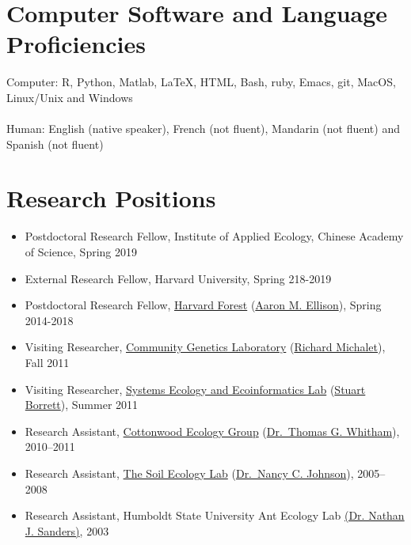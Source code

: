 \documentclass[a4paper]{article}
\begin{document}
\section{Computer Software and Language
Proficiencies}\label{computer-software-and-language-proficiencies}

Computer: R, Python, Matlab, LaTeX, HTML, Bash, ruby, Emacs, git,
MacOS, Linux/Unix and Windows\\\\Human: English (native speaker),
French (not fluent), Mandarin (not fluent) and Spanish (not fluent)

\section{Research Positions}\label{research-experience}

\begin{itemize}
\item Postdoctoral Research Fellow, Institute of Applied Ecology,
  Chinese Academy of Science, Spring 2019
\item External Research Fellow, Harvard University, Spring 218-2019
\item
  Postdoctoral Research Fellow, 
  \href{http://harvardforest.fas.harvard.edu/}{Harvard Forest}
  (\href{http://harvardforest.fas.harvard.edu/aaron-ellison}{Aaron M. Ellison}), Spring 2014-2018
\item
  Visiting Researcher,
  \href{https://www4.bordeaux-aquitaine.inra.fr/biogeco/}{Community
  Genetics Laboratory}
  (\href{http://www4.bordeaux-aquitaine.inra.fr/biogeco_eng/People/Former-members/Michalet-Richard}{Richard Michalet}), Fall 2011
\item
  Visiting Researcher, \href{http://people.uncw.edu/borretts/}{Systems
  Ecology and Ecoinformatics Lab}
  (\href{http://people.uncw.edu/borretts/people.html}{Stuart
  Borrett}), Summer 2011
\item
  Research Assistant, \href{http://www.poplar.nau.edu/}{Cottonwood
  Ecology Group}
  (\href{http://www.poplar.nau.edu/people.php?mode=showus\&user=tgw}{Dr.~Thomas
  G. Whitham}), 2010--2011
\item
  Research Assistant,
  \href{http://www.nau.edu/~envsci/johnsonlab/index.htm}{The Soil
  Ecology Lab}
  (\href{http://www.nau.edu/~envsci/johnsonlab/NCJ.htm}{Dr.~Nancy C.
  Johnson}), 2005--2008
\item
  Research Assistant, Humboldt State University Ant Ecology Lab
  \href{http://web.utk.edu/~nsanders/nate.html}{(Dr. Nathan J.
  Sanders)}, 2003
\end{itemize}
\end{document}
